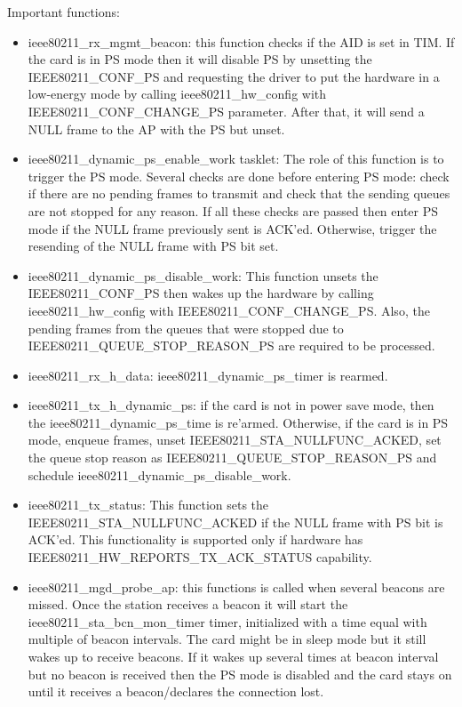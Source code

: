 Important functions:
\begin{itemize}
\item ieee80211_rx_mgmt_beacon: this function checks if the AID is set in TIM. If the card is in PS mode then it will disable PS by unsetting the IEEE80211_CONF_PS and requesting the driver to put the hardware in a low-energy mode by calling ieee80211_hw_config with IEEE80211_CONF_CHANGE_PS parameter. After that, it will send a NULL frame to the AP with the PS but unset.
\item ieee80211_dynamic_ps_enable_work tasklet: The role of this function is to trigger the PS mode. Several checks are done before entering PS mode: check if there are no pending frames to transmit and check that the sending queues are not stopped for any reason. If all these checks are passed then enter PS mode if the NULL frame previously sent is ACK'ed. Otherwise, trigger the resending of the NULL frame with PS bit set.
\item ieee80211_dynamic_ps_disable_work: This function unsets the IEEE80211_CONF_PS then wakes up the hardware by calling ieee80211_hw_config with IEEE80211_CONF_CHANGE_PS. Also, the pending frames from the queues that were stopped due to IEEE80211_QUEUE_STOP_REASON_PS are required to be processed.
\item ieee80211_rx_h_data: ieee80211_dynamic_ps_timer is rearmed.
\item ieee80211_tx_h_dynamic_ps: if the card is not in power save mode, then the ieee80211_dynamic_ps_time is re'armed. Otherwise, if the card is in PS mode, enqueue frames, unset IEEE80211_STA_NULLFUNC_ACKED, set the queue stop reason as IEEE80211_QUEUE_STOP_REASON_PS and schedule ieee80211_dynamic_ps_disable_work.
\item ieee80211_tx_status: This function sets the IEEE80211_STA_NULLFUNC_ACKED if the NULL frame with PS bit is ACK'ed. This functionality is supported only if hardware has IEEE80211_HW_REPORTS_TX_ACK_STATUS capability.
\item ieee80211_mgd_probe_ap: this functions is called when several beacons are missed. Once the station receives a beacon it will start the ieee80211_sta_bcn_mon_timer timer, initialized with a time equal with multiple of beacon intervals. The card might be in sleep mode but it still wakes up to receive beacons. If it wakes up several times at beacon interval but no beacon is received then the PS mode is disabled and the card stays on until it receives a beacon/declares the connection lost.
\end{itemize}

